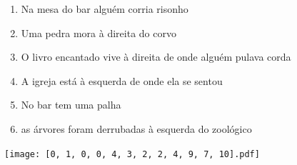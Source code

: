 \documentclass[12pt]{article}
\begin{document}
		 

\pagebreak


	\begin{enumerate}
		  \sffamily %
		  \large %


\vfill \item
Na mesa do bar	%
alguém corria risonho	%

\vfill \item
Uma pedra mora	%
à direita
do corvo	%

\vfill \item
O livro encantado vive	%
à direita
de onde alguém pulava corda	%

\vfill \item
A igreja está	%
à esquerda
de onde ela se sentou	%

\vfill \item
No bar	%
tem uma palha	%

\vfill \item
as árvores foram derrubadas	%
à esquerda
do zoológico	%
	\end{enumerate}
		  
		  \hfill

		  \vfill

\texttt{[image: [0, 1, 0, 0, 4, 3, 2, 2, 4, 9, 7, 10].pdf]}


	\hfill	  	  


\pagebreak			
\end{document}
